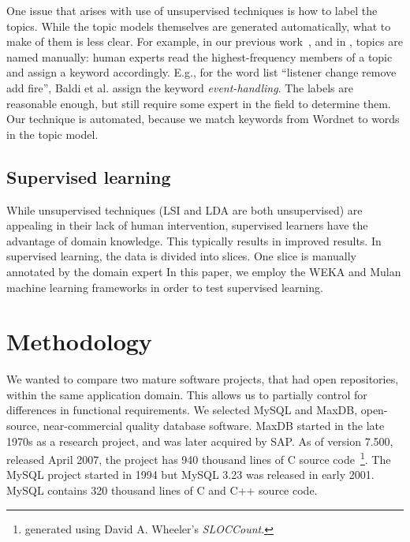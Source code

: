 \documentclass[10pt, conference, compsocconf]{IEEEtran}
\begin{document}
One issue that arises with use of unsupervised techniques is how to label the topics. While the topic models themselves are generated automatically, what to make of them is less clear. For example, in our previous work~\cite{Hindle09ICSM}, and in \cite{Baldi2008}, topics are named manually: human experts read the highest-frequency members of a topic and assign a keyword accordingly. E.g., for the word list ``listener change remove add fire'', Baldi et al. assign the keyword \emph{event-handling}. The labels are reasonable enough, but still require some expert in the field to determine them. Our technique is automated, because we match keywords from Wordnet to words in the topic model. 

\subsection{Supervised learning}
While unsupervised techniques (LSI and LDA are both unsupervised) are appealing in their lack of human intervention, supervised learners have the advantage of domain knowledge. This typically results in improved results. In supervised learning, the data is divided into slices. One slice is manually annotated by the domain expert
In this paper, we employ the WEKA and Mulan machine learning frameworks in order to test supervised learning.
 
\section{Methodology}

\begin{comment}
\end{comment}

We wanted to compare two mature software projects, that had open repositories, within the same application domain. This allows us to partially control for differences in functional requirements. We selected MySQL and MaxDB, open-source, near-commercial quality database software. MaxDB started in the late 1970s as a research project, and was later acquired by SAP. As of version 7.500, released April 2007, the project has 940 thousand lines of C source code~\footnote{generated using David A. Wheeler's \emph{SLOCCount}.}.
The MySQL project started in 1994 but MySQL 3.23 was released in early 2001. MySQL contains 320 thousand lines of C and C++ source code. 
\end{document}
